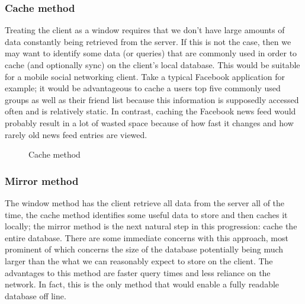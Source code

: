 \subsubsection{Cache method}

Treating the client as a window requires that we don't have large amounts of
data constantly being retrieved from the server. If this is not the case, then
we may want to identify some data (or queries) that are commonly used in order
to cache (and optionally sync) on the client's local database. This would be
suitable for a mobile social networking client. Take a typical Facebook
application for example; it would be advantageous to cache a users top five
commonly used groups as well as their friend list because this information is
supposedly accessed often and is relatively static. In contrast, caching the
Facebook news feed would probably result in a lot of wasted space because of how
fast it changes and how rarely old news feed entries are viewed. 



\begin{figure}[h!]
\centering
{}
\caption{Cache method}
\label{fig:cache}
\end{figure}


\subsubsection{Mirror method}
The window method has the client retrieve all data from the server all of the
time, the cache method identifies some useful data to store and then caches it
locally; the mirror method is the next natural step in this progression: cache
the entire database. There are some immediate concerns with this approach, most
prominent of which concerns the size of the database potentially being much
larger than the what we can reasonably expect to store on the client. The
advantages to this method are faster query times and less reliance on the
network. In fact, this is the only method that would enable a fully readable
database off line.

